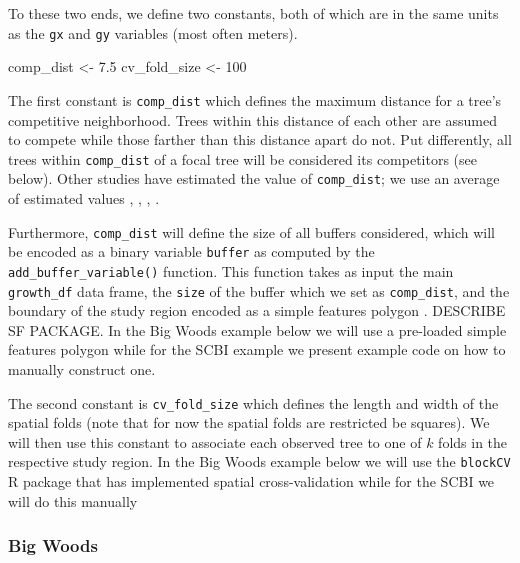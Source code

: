 \documentclass[12pt]{article}
\newenvironment{Shaded}{\begin{snugshade}}{\end{snugshade}}
\newcommand{\DecValTok}[1]{\textcolor[rgb]{0.00,0.00,0.81}{#1}}
\newcommand{\FloatTok}[1]{\textcolor[rgb]{0.00,0.00,0.81}{#1}}
\newcommand{\NormalTok}[1]{#1}
\newcommand{\StringTok}[1]{\textcolor[rgb]{0.31,0.60,0.02}{#1}}
\begin{document}
To these two ends, we define two constants, both of which are in the
same units as the \texttt{gx} and \texttt{gy} variables (most often
meters).

\begin{Shaded}
\begin{Highlighting}[]
\NormalTok{comp_dist <-}\StringTok{ }\FloatTok{7.5}
\NormalTok{cv_fold_size <-}\StringTok{ }\DecValTok{100}
\end{Highlighting}
\end{Shaded}

The first constant is \texttt{comp\_dist} which defines the maximum
distance for a tree's competitive neighborhood. Trees within this
distance of each other are assumed to compete while those farther than
this distance apart do not. Put differently, all trees within
\texttt{comp\_dist} of a focal tree will be considered its competitors
(see below). Other studies have estimated the value of
\texttt{comp\_dist}; we use an average of estimated values
\citet{canham_neighborhood_2004}, \citet{uriarte_spatially_2004},
\citet{tatsumi2013}, \citet{canham_neighborhood_2006}.

Furthermore, \texttt{comp\_dist} will define the size of all buffers
considered, which will be encoded as a binary variable \texttt{buffer}
as computed by the \texttt{add\_buffer\_variable()} function. This
function takes as input the main \texttt{growth\_df} data frame, the
\texttt{size} of the buffer which we set as \texttt{comp\_dist}, and the
boundary of the study region encoded as a simple features polygon
\citet{pebesma_simple_2018}. DESCRIBE SF PACKAGE. In the Big Woods
example below we will use a pre-loaded simple features polygon while for
the SCBI example we present example code on how to manually construct
one.

The second constant is \texttt{cv\_fold\_size} which defines the length
and width of the spatial folds (note that for now the spatial folds are
restricted be squares). We will then use this constant to associate each
observed tree to one of \(k\) folds in the respective study region. In
the Big Woods example below we will use the \texttt{blockCV} R package
that has implemented spatial cross-validation while for the SCBI we will
do this manually \citet{valavi_blockcv_2019}

\hypertarget{big-woods-2}{%
\subsubsection{Big Woods}\label{big-woods-2}}
\end{document}

